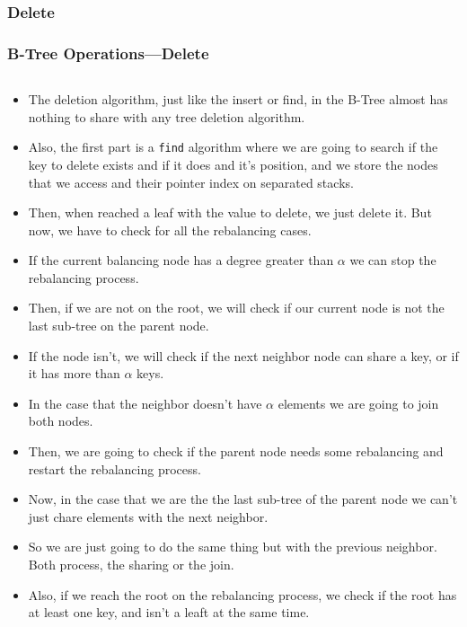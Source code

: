 \begin{frame}
    \subsubsection{Delete}
    \frametitle{B-Tree Operations---Delete}
    \begin{columns}
        \begin{column}{\textlecolumn}
            \begin{block}{}
                \begin{itemize}
                    \item The deletion algorithm, just like the insert or find, in the B-Tree almost has nothing to share with any tree deletion algorithm.
                    \item Also, the first part is a \lstinline|find| algorithm where we are going to search if the key to delete exists and if it does
                        and it's position, and we store the nodes that we access and their pointer index on separated stacks.
                    \item Then, when reached a leaf with the value to delete, we just delete it. 
                        But now, we have to check for all the rebalancing cases.
                    \item If the current balancing node has a degree greater than \(\alpha\) we can stop the rebalancing process.
                    \item Then, if we are not on the root, we will check if our current node is not the last sub-tree on the parent node.
                    \item If the node isn't, we will check if the next neighbor node can share a key, or if it has more than \(\alpha\) keys.
                    \item In the case that the neighbor doesn't have \(\alpha\) elements we are going to join both nodes.
                    \item Then, we are going to check if the parent node needs some rebalancing and restart the rebalancing process.
                    \item Now, in the case that we are the the last sub-tree of the parent node we can't just chare elements with the next neighbor.
                    \item So we are just going to do the same thing but with the previous neighbor. Both process, the sharing or the join.
                    \item Also, if we reach the root on the rebalancing process, we check if the root has at least one key, and isn't a leaft at the same time.

\end{itemize}
\end{block}
\end{column}
\end{columns}
\end{frame}

